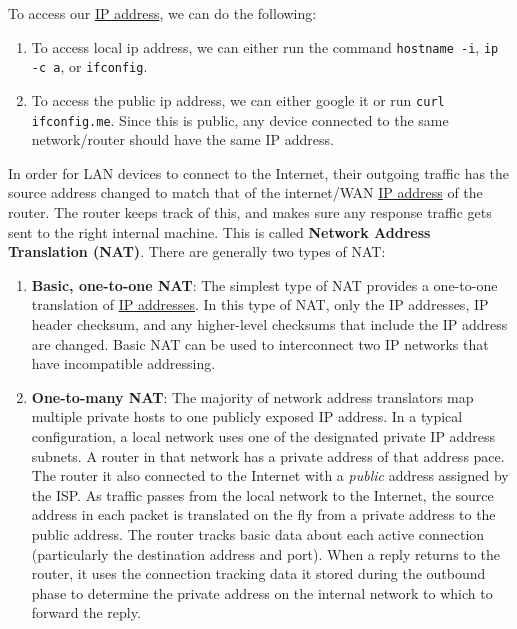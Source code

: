 \documentclass{article}
\newcounter{definition}[section]
\begin{document}
      To access our \hyperref[def:ip-address]{IP address}, we can do the following: 
      \begin{enumerate} 
        \item To access local ip address, we can either run the command \texttt{hostname -i}, \texttt{ip -c a}, or \texttt{ifconfig}.
          
        \item To access the public ip address, we can either google it or run \texttt{curl ifconfig.me}. Since this is public, any device connected to the same network/router should have the same IP address. 
      \end{enumerate}

      \begin{definition}[NAT]
        \label{def:nat-2}
        In order for LAN devices to connect to the Internet, their outgoing traffic has the source address changed to match that of the internet/WAN \hyperref[def:ip-address]{IP address} of the router. The router keeps track of this, and makes sure any response traffic gets sent to the right internal machine. This is called \textbf{Network Address Translation (NAT)}. There are generally two types of NAT: 

        \begin{enumerate}
          \item \textbf{Basic, one-to-one NAT}: The simplest type of NAT provides a one-to-one translation of \hyperref[def:ip-addresses]{IP addresses}. In this type of NAT, only the IP addresses, IP header checksum, and any higher-level checksums that include the IP address are changed. Basic NAT can be used to interconnect two IP networks that have incompatible addressing. 

          \item \textbf{One-to-many NAT}: The majority of network address translators map multiple private hosts to one publicly exposed IP address. In a typical configuration, a local network uses one of the designated private IP address subnets. A router in that network has a private address of that address pace. The router it also connected to the Internet with a \textit{public} address assigned by the ISP. As traffic passes from the local network to the Internet, the source address in each packet is translated on the fly from a private address to the public address. The router tracks basic data about each active connection (particularly the destination address and port). When a reply returns to the router, it uses the connection tracking data it stored during the outbound phase to determine the private address on the internal network to which to forward the reply. 
        \end{enumerate}
      \end{definition}
\end{document}
